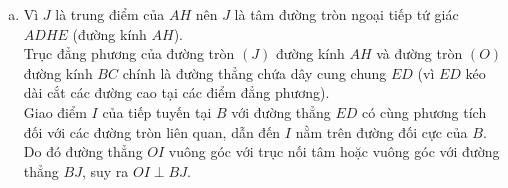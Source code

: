 \begin{bt}
{\begin{enumerate}[a)]
	Xét tam giác $DEF$, $K$ là giao điểm của cạnh đối diện $ED$ kéo dài với $BC$. Theo tính chất chùm điều hoà của tứ giác toàn phần $AB.CD.EF$, bộ điểm $(K, F, B, C) = -1$ là hàng điểm điều hoà.\\
	Vì $O$ là trung điểm của $BC$ nên theo hệ thức Newton cho hàng điểm điều hoà với trung điểm $O$:
	$OB^2 = OC^2 = OF \cdot OK$.\\
	Mặt khác theo hệ thức Maclaurin: $FO \cdot FK = FB \cdot FC$.
	\item Vì $J$ là trung điểm của $AH$ nên $J$ là tâm đường tròn ngoại tiếp tứ giác $ADHE$ (đường kính $AH$).\\
	Trục đẳng phương của đường tròn $(J)$ đường kính $AH$ và đường tròn $(O)$ đường kính $BC$ chính là đường thẳng chứa dây cung chung $ED$ (vì $ED$ kéo dài cắt các đường cao tại các điểm đẳng phương).\\
	Giao điểm $I$ của tiếp tuyến tại $B$ với đường thẳng $ED$ có cùng phương tích đối với các đường tròn liên quan, dẫn đến $I$ nằm trên đường đối cực của $B$.\\
	Do đó đường thẳng $OI$ vuông góc với trục nối tâm hoặc vuông góc với đường thẳng $BJ$, suy ra $OI \perp BJ$.
\end{enumerate}
}
\end{bt}


